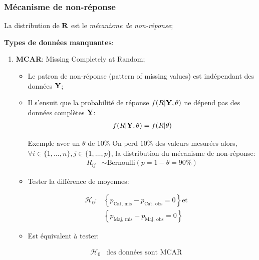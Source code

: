 \documentclass[10pt, french]{article}
\begin{document}
\begin{multicols*}{3}
\subsubsection*{Mécanisme de non-réponse}
La distribution de $\mathbf{R}$ est le \textit{mécanisme de non-réponse};

\textbf{Types de données manquantes}:
\begin{enumerate}
	\item	\textbf{MCAR}: Missing Completely at Random;
		\begin{itemize}
		\item	Le patron de non-réponse (pattern of missing values) est indépendant des données $\mathbf{Y}$;
		\item	Il s'ensuit que la probabilité de réponse $f(R | \mathbf{Y}, \theta)$ ne dépend pas des données complètes $\mathbf{Y}$:
			\begin{align*}
			f(R | \mathbf{Y}, \theta) &= f(R | \theta) \\
			\end{align*}
		\begin{examplebox}{Exemple avec un $\theta$ de 10\%}
		On perd $10\%$ des valeurs mesurées alors, $\forall i \in \{1, \dots, n\}, j \in \{1, \dots, p\}$, la distribution du mécanisme de non-réponse:
			\begin{align*}
			R_{ij} 
			&\sim 	\text{Bernoulli}(p = 1 - \theta =  90\%)
			\end{align*}
		\end{examplebox}
		\item	Tester la différence de moyennes:
		\end{itemize}	
		\setlength{\mathindent}{-2cm}
			\begin{align*}
			\mathcal{H}_{0}:
			&\left\{ p_{\text{Cat, mis}} - p_{\text{Cat, obs}} = 0 \right\} 
			\text{et}	\\
			&\left\{ p_{\text{Maj, mis}} - p_{\text{Maj, obs}} = 0 \right\}
			\end{align*}
		\setlength{\mathindent}{1cm}
		\begin{itemize}
		\item[]	Est équivalent à tester: 
		\end{itemize}	
		\setlength{\mathindent}{-2cm}
			\begin{align*}
			\mathcal{H}_{0}
			&:	\text{les données sont MCAR}
			\end{align*}
		\setlength{\mathindent}{1cm}
		\begin{itemize}

\end{itemize}
\end{enumerate}
\end{multicols*}
\end{document}
